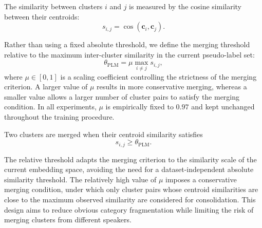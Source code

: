 \documentclass[lettersize,journal]{IEEEtran}
\begin{document}
The similarity between clusters $i$ and $j$ is measured by the cosine
similarity between their centroids:
\begin{equation}
s_{i,j}
=
\cos(\mathbf{c}_i,\mathbf{c}_j).
\end{equation}

Rather than using a fixed absolute threshold, we define the merging
threshold relative to the maximum inter-cluster similarity in the
current pseudo-label set:
\begin{equation}
\theta_{\mathrm{PLM}}
=
\mu
\max_{i\neq j}
s_{i,j},
\end{equation}
where $\mu\in[0,1]$ is a scaling coefficient controlling the
strictness of the merging criterion. A larger value of $\mu$ results
in more conservative merging, whereas a smaller value allows a larger
number of cluster pairs to satisfy the merging condition. In all
experiments, $\mu$ is empirically fixed to $0.97$ and kept unchanged
throughout the training procedure.

Two clusters are merged when their centroid similarity satisfies
\begin{equation}
s_{i,j}
\geq
\theta_{\mathrm{PLM}}.
\end{equation}

The relative threshold adapts the merging criterion to the similarity
scale of the current embedding space, avoiding the need for a
dataset-independent absolute similarity threshold. The relatively high
value of $\mu$ imposes a conservative merging condition, under which
only cluster pairs whose centroid similarities are close to the
maximum observed similarity are considered for consolidation. This
design aims to reduce obvious category fragmentation while limiting
the risk of merging clusters from different speakers.
\end{document}
